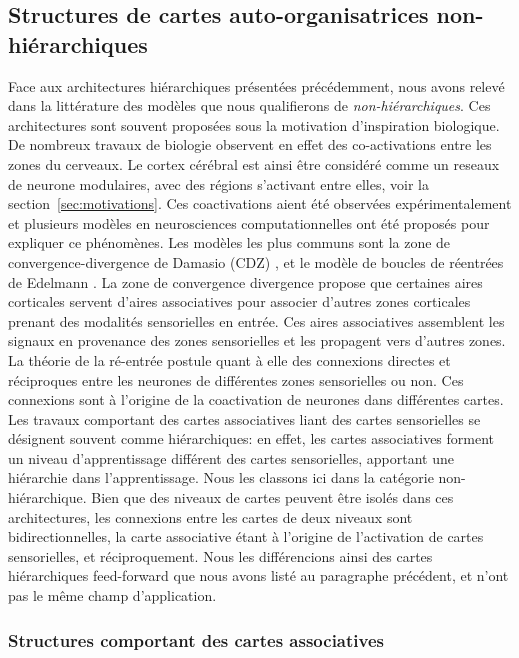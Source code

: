 \documentclass[../main]{subfiles}
\begin{document}
\subsection{Structures de cartes auto-organisatrices non-hiérarchiques}

Face aux architectures hiérarchiques présentées précédemment, nous avons relevé dans la littérature des modèles que nous qualifierons de \emph{non-hiérarchiques}.
Ces architectures sont souvent proposées sous la motivation d'inspiration biologique. 
De nombreux travaux de biologie observent en effet des co-activations entre les zones du cerveaux. Le cortex cérébral est ainsi être considéré comme un reseaux de neurone modulaires, avec des régions s'activant entre elles, voir la section~\ref{sec:motivations}. Ces coactivations aient été observées expérimentalement et plusieurs modèles en neurosciences computationnelles ont été proposés pour expliquer ce phénomènes. Les modèles les plus communs sont la zone de convergence-divergence de Damasio (CDZ) \cite{damasio_time-locked_1989}, et le modèle de boucles de réentrées de Edelmann \cite{Edelman1982GroupSA}.
La zone de convergence divergence propose que certaines aires corticales servent d'aires associatives pour associer d'autres zones corticales prenant des modalités sensorielles en entrée. Ces aires associatives assemblent les signaux en provenance des zones sensorielles et les propagent vers d'autres zones. 
La théorie de la ré-entrée postule quant à elle des connexions directes et réciproques entre les neurones de différentes zones sensorielles ou non. Ces connexions sont à l'origine de la coactivation de neurones dans différentes cartes.
Les travaux comportant des cartes associatives liant des cartes sensorielles se désignent souvent comme hiérarchiques: en effet, les cartes associatives forment un niveau d'apprentissage différent des cartes sensorielles, apportant une hiérarchie dans l'apprentissage. 
Nous les classons ici dans la catégorie non-hiérarchique. Bien que des niveaux de cartes peuvent être isolés dans ces architectures, les connexions entre les cartes de deux niveaux sont bidirectionnelles, la carte associative étant à l'origine de l'activation de cartes sensorielles, et réciproquement.
Nous les différencions ainsi des cartes hiérarchiques feed-forward que nous avons listé au paragraphe précédent, et n'ont pas le même champ d'application.

\subsubsection{Structures comportant des cartes associatives}
\end{document}
